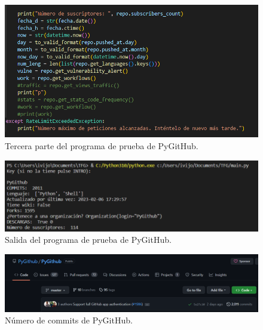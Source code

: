 \documentclass[a4paper, 12pt]{book}
\begin{document}
\begin{figure}
    \centering
    \includegraphics[width=1\textwidth, keepaspectratio]{img/pygithub_3.png}
    \caption{Tercera parte del programa de prueba de PyGitHub.}\label{fig:pygithub_3}
\end{figure}

\begin{figure}
    \centering
    \includegraphics[width=1\textwidth, keepaspectratio]{img/pygithub_salida.png}
    \caption{Salida del programa de prueba de PyGitHub.}\label{fig:pygithub_salida}
\end{figure}

\begin{figure}
    \centering
    \includegraphics[width=1\textwidth, keepaspectratio]{img/pygithub_commits.png}
    \caption{Número de commits de PyGitHub.}\label{fig:pygithub_commits}
\end{figure}
\end{document}
